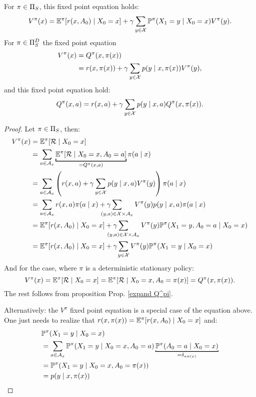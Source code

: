 \begin{corollary}\label{V^pi,Q^pi relation} 
For \(\pi\in\Pi_S\), this fixed point equation holds:
\[
	V^\pi(x) = \mathbb{E}^\pi[r(x,A_0)\mid X_0=x] 
	+ \gamma \sum_{y\in\mathcal{X}} \mathbb{P}^\pi(X_1=y \mid X_0=x) V^\pi(y).
\]	
For \(\pi\in\Pi_S^D\) the fixed point equation
\begin{align*}
	V^\pi(x)&=Q^\pi(x,\pi(x))\\
	 &=r(x,\pi(x))+\gamma\sum\limits_{y\in\mathcal{X}}p(y\mid x,\pi(x))V^\pi(y),
\end{align*}
and this fixed point equation hold:
\[
	Q^\pi(x,a)=r(x,a)+\gamma\sum_{y\in\mathcal{X}}p(y\mid x,a)Q^\pi(x,\pi(x)).
\]
\end{corollary}

\begin{proof} Let \(\pi\in\Pi_S\), then:
	\begin{align}
		V^\pi(x)&=\E^\pi[\cR\mid X_0=x] \nonumber\\
		&=\sum_{a\in\cA_x} 
		\underbracket[1pt]{\E^\pi[\cR\mid X_0=x, A_0=a]}_{=Q^\pi(x,a)}\label{stoch pi: V^pi in terms of Q^pi}
		\pi(a\mid x)\\
		&=\sum_{a\in\cA_x} \left(r(x,a)
		+\gamma\sum_{y\in\cX}p(y\mid x,a)V^\pi(y)\right)\pi(a\mid x)\nonumber\\
		&=\sum_{a\in\cA_x}r(x,a)\pi(a\mid x) 
		+ \gamma\smashoperator[l]{\sum_{(y,a)\in\cX\times\cA_x}} 
		V^\pi(y) p(y\mid x,a)\pi(a\mid x)
		\label{stoch pi: fixed point proof}\\
		&=\E^\pi[r(x,A_0)\mid X_0=x] 
		+ \gamma\smashoperator[l]{\sum_{(y,a)\in\cX\times\cA_x}} V^\pi(y)
		\Pr^\pi(X_1=y, A_0=a \mid X_0=x)\nonumber\\
		&=\E^\pi[r(x,A_0)\mid X_0=x] + \gamma\smashoperator[l]{\sum_{y\in\cX}} V^\pi(y)
		\Pr^\pi(X_1=y\mid X_0=x)\nonumber
	\end{align}
	And for the case, where \(\pi\) is a deterministic stationary policy:
	\[
		V^\pi(x)=\mathbb{E}^\pi[\mathcal{R}\mid X_0=x]=\mathbb{E}^\pi[\mathcal{R}\mid X_0=x, A_0=\pi(x)]=Q^\pi(x,\pi(x)).
	\]
	The rest follows from proposition Prop. \ref{expand Q^pi}. 
	
	Alternatively: the \(V^\pi\) fixed point equation is a special case of the equation above. One just needs to realize that \(r(x,\pi(x)) = \mathbb{E}^\pi[r(x,A_0)\mid X_0=x]\) and:
	\begin{align*}
		&\Pr^\pi(X_1=y\mid X_0=x)\\
		&=\sum_{a\in\cA_x} \Pr^\pi(X_1=y\mid X_0=x, A_0=a) 
		\underbracket[1pt][1pt]{\Pr^\pi(A_0=a\mid X_0=x)}_{=\delta_{a\pi(x)}}\\
		&=\Pr^\pi(X_1=y\mid X_0=x, A_0=\pi(x))\\
		&=p(y\mid x,\pi(x))\qedhere
	\end{align*}
\end{proof}

